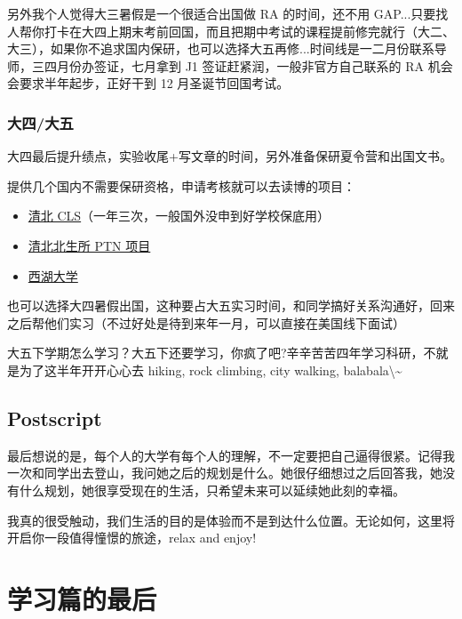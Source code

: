 \documentclass[zihao=-4,fontset=none]{Beautybook-CN}
\begin{document}
另外我个人觉得大三暑假是一个很适合出国做 RA 的时间，还不用 GAP...只要找人帮你打卡在大四上期末考前回国，而且把期中考试的课程提前修完就行（大二、大三），如果你不追求国内保研，也可以选择大五再修...时间线是一二月份联系导师，三四月份办签证，七月拿到 J1 签证赶紧润，一般非官方自己联系的 RA 机会会要求半年起步，正好干到 12 月圣诞节回国考试。

\subsection{大四/大五}

大四最后提升绩点，实验收尾+写文章的时间，另外准备保研夏令营和出国文书。

提供几个国内不需要保研资格，申请考核就可以去读博的项目：
\begin{itemize}
\item \href{https://life.tsinghua.edu.cn/info/1120/4043.htm}{清北 CLS}（一年三次，一般国外没申到好学校保底用）
\item \href{http://www.nibs.ac.cn/newsshow.php?cid=4&sid=14&id=2308}{清北北生所 PTN 项目}
\item \href{https://westlake.edu.cn/admissions_aid/graduate/zsdt1/202209/t20220905_22470.shtml}{西湖大学}
\end{itemize}

也可以选择大四暑假出国，这种要占大五实习时间，和同学搞好关系沟通好，回来之后帮他们实习（不过好处是待到来年一月，可以直接在美国线下面试）

大五下学期怎么学习？大五下还要学习，你疯了吧?辛辛苦苦四年学习科研，不就是为了这半年开开心心去 hiking, rock climbing, city walking, balabala\textbackslash \textasciitilde{}

\section{Postscript}

最后想说的是，每个人的大学有每个人的理解，不一定要把自己逼得很紧。记得我一次和同学出去登山，我问她之后的规划是什么。她很仔细想过之后回答我，她没有什么规划，她很享受现在的生活，只希望未来可以延续她此刻的幸福。

我真的很受触动，我们生活的目的是体验而不是到达什么位置。无论如何，这里将开启你一段值得憧憬的旅途，relax and enjoy!

\chapter{学习篇的最后}
\end{document}
